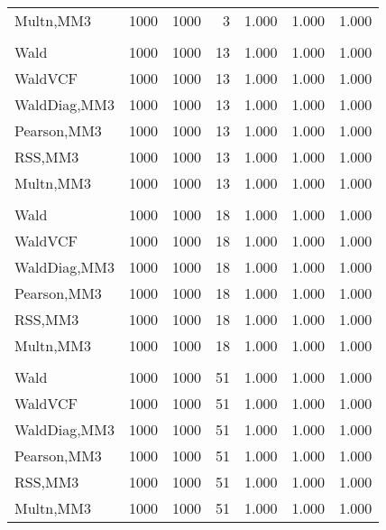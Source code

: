 \documentclass[
]{article}
\begin{document}
\begin{table}[H]
{\begin{tabular}[t]{lrrrrrr}
\hspace{1em}Multn,MM3 & 1000 & 1000 & 3 & 1.000 & 1.000 & 1.000\\
\addlinespace[0.3em]
\multicolumn{7}{l}{\textbf{1F 15V}}\\
\hspace{1em}Wald & 1000 & 1000 & 13 & 1.000 & 1.000 & 1.000\\
\hspace{1em}WaldVCF & 1000 & 1000 & 13 & 1.000 & 1.000 & 1.000\\
\hspace{1em}WaldDiag,MM3 & 1000 & 1000 & 13 & 1.000 & 1.000 & 1.000\\
\hspace{1em}Pearson,MM3 & 1000 & 1000 & 13 & 1.000 & 1.000 & 1.000\\
\hspace{1em}RSS,MM3 & 1000 & 1000 & 13 & 1.000 & 1.000 & 1.000\\
\hspace{1em}Multn,MM3 & 1000 & 1000 & 13 & 1.000 & 1.000 & 1.000\\
\addlinespace[0.3em]
\multicolumn{7}{l}{\textbf{2F 10V}}\\
\hspace{1em}Wald & 1000 & 1000 & 18 & 1.000 & 1.000 & 1.000\\
\hspace{1em}WaldVCF & 1000 & 1000 & 18 & 1.000 & 1.000 & 1.000\\
\hspace{1em}WaldDiag,MM3 & 1000 & 1000 & 18 & 1.000 & 1.000 & 1.000\\
\hspace{1em}Pearson,MM3 & 1000 & 1000 & 18 & 1.000 & 1.000 & 1.000\\
\hspace{1em}RSS,MM3 & 1000 & 1000 & 18 & 1.000 & 1.000 & 1.000\\
\hspace{1em}Multn,MM3 & 1000 & 1000 & 18 & 1.000 & 1.000 & 1.000\\
\addlinespace[0.3em]
\multicolumn{7}{l}{\textbf{3F 15V}}\\
\hspace{1em}Wald & 1000 & 1000 & 51 & 1.000 & 1.000 & 1.000\\
\hspace{1em}WaldVCF & 1000 & 1000 & 51 & 1.000 & 1.000 & 1.000\\
\hspace{1em}WaldDiag,MM3 & 1000 & 1000 & 51 & 1.000 & 1.000 & 1.000\\
\hspace{1em}Pearson,MM3 & 1000 & 1000 & 51 & 1.000 & 1.000 & 1.000\\
\hspace{1em}RSS,MM3 & 1000 & 1000 & 51 & 1.000 & 1.000 & 1.000\\
\hspace{1em}Multn,MM3 & 1000 & 1000 & 51 & 1.000 & 1.000 & 1.000\\
\bottomrule
\end{tabular}}
\endgroup{}
\end{table}
\end{document}

